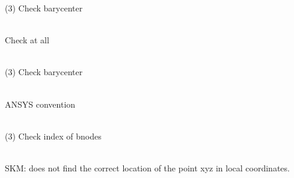 \begin{DoxyRefList}
\label{todo__todo000075}%
%
(3) Check barycenter  
\item[Member \doxylink{classcsmp_1_1_isoparametric_quadratic_prism_a0eb89dd35e7fbba1789dfa45d429fb9f}{csmp\+::Isoparametric\+Quadratic\+Prism\+::Integral\+NN} (\doxylink{classcsmp_1_1_dense_matrix}{Dense\+Matrix$<$ DM\+\_\+\+MIN $>$} \&M)]\hfill \\
\label{todo__todo000077}%
%
Check at all  
\item[Member \doxylink{classcsmp_1_1_isoparametric_quadratic_prism_a7cc118c625b16c783159b03a3029581f}{csmp\+::Isoparametric\+Quadratic\+Prism\+::N\+\_\+\+At\+Bary\+Center} (std\+::vector$<$ double $>$ \&N)]\hfill \\
\label{todo__todo000076}%
%
(3) Check barycenter  
\item[Member \doxylink{classcsmp_1_1_isoparametric_quadratic_pyramid_a6074d88c63cd328e9801cf528f8c7ebd}{csmp\+::Isoparametric\+Quadratic\+Pyramid\+::Nodes\+Per\+Face} (uint32\+\_\+t face) const]\hfill \\
\label{todo__todo000078}%
%
ANSYS convention  
\item[Member \doxylink{classcsmp_1_1_isoparametric_quadratic_quadrilateral_abbffb01b8ddf81c16f5f8a23ad568fed}{csmp\+::Isoparametric\+Quadratic\+Quadrilateral\+::Output\+Node\+Data\+To\+VTK} (const char \texorpdfstring{$\ast$}{*}file\+\_\+name, const char \texorpdfstring{$\ast$}{*}var\+\_\+name, \doxylink{classcsmp_1_1_dense_matrix}{Dense\+Matrix$<$ DM\+\_\+\+MIN $>$} \&DATA) const]\hfill \\
\label{todo__todo000079}%
%
(3) Check index of bnodes  
\item[Member \doxylink{classcsmp_1_1_isoparametric_quadratic_tetrahedron_a931cae919c839063d3fefdb1b3d40da9}{csmp\+::Isoparametric\+Quadratic\+Tetrahedron\+::N} (std\+::vector$<$ double $>$ \&N, const std\+::vector$<$ double $>$ \&xyz)]\hfill \\
\label{todo__todo000080}%
%
SKM\+: does not find the correct location of the point xyz in local coordinates. 
\item[Member \doxylink{classcsmp_1_1_isoparametric_quadratic_tetrahedron___test_a594ee9a1048e23678788960b1fcb1ead}{csmp\+::Isoparametric\+Quadratic\+Tetrahedron\+\_\+\+Test\+::Check\+Element\+Face\+Consistency} (const \doxylink{classcsmp_1_1_element}{Element$<$ 3\+U $>$} \&)]\hfill \\

\end{DoxyRefList}
